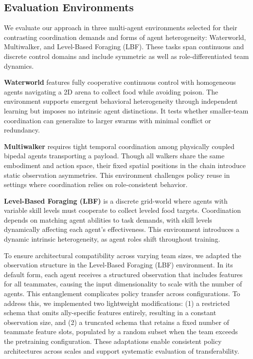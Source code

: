 \documentclass{article}
\begin{document}
\subsection{Evaluation Environments} 

We evaluate our approach in three multi-agent environments selected for their contrasting 
coordination demands and forms of agent heterogeneity: 
Waterworld, Multiwalker, and Level-Based Foraging (LBF). These tasks span continuous 
and discrete control domains and include symmetric as well as role-differentiated team dynamics.

\textbf{Waterworld} features fully cooperative continuous control with homogeneous agents 
navigating a 2D arena to collect food while avoiding poison. The environment supports emergent 
behavioral heterogeneity through independent learning but imposes no intrinsic agent distinctions. 
It tests whether smaller-team coordination can generalize to larger swarms with minimal 
conflict or redundancy.

\textbf{Multiwalker} requires tight temporal coordination among physically coupled bipedal agents 
transporting a payload. Though all walkers share the same embodiment and action space, 
their fixed spatial positions in the chain introduce static observation asymmetries. 
This environment challenges policy reuse in settings where coordination relies on 
role-consistent behavior.

\textbf{Level-Based Foraging (LBF)} is a discrete grid-world where agents with variable skill 
levels must cooperate to collect leveled food targets. Coordination depends on matching agent 
abilities to task demands, with skill levels dynamically affecting each agent's effectiveness. 
This environment introduces a dynamic intrinsic heterogeneity, as agent roles shift throughout 
training.

To ensure architectural compatibility across varying team sizes, we adapted the observation 
structure in the Level-Based Foraging (LBF) environment. In its default form, 
each agent receives a structured observation that includes features for all teammates, 
causing the input dimensionality to scale with the number of agents. 
This entanglement complicates policy transfer across configurations. 
To address this, we implemented two lightweight modifications: 
(1) a restricted schema that omits ally-specific features entirely, 
resulting in a constant observation size, and 
(2) a truncated schema that retains a fixed number of teammate feature slots, 
populated by a random subset when the team exceeds the pretraining configuration. 
These adaptations enable consistent policy architectures across scales and support 
systematic evaluation of transferability.
\end{document}
